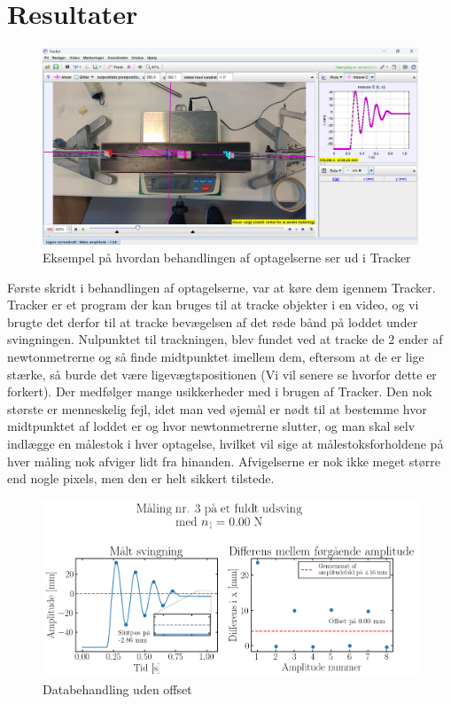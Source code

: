 \chapter{Resultater}
\begin{figure}[htbp]
    \centering
    \includegraphics[width=0.8\linewidth,origin=c]{figures/data_eksempel.png}
    \caption{Eksempel på hvordan behandlingen af optagelserne ser ud i Tracker}
    \label{fig:tracker}
\end{figure}
Første skridt i behandlingen af optagelserne, var at køre dem igennem Tracker. 
Tracker er et program der kan bruges til at tracke objekter i en video, 
og vi brugte det derfor til at tracke bevægelsen af det røde bånd på loddet under svingningen.
Nulpunktet til trackningen, blev fundet ved at tracke de 2 ender af newtonmetrerne og så finde midtpunktet imellem dem, 
eftersom at de er lige stærke, så burde det være ligevægtspositionen (Vi vil senere se hvorfor dette er forkert).
Der medfølger mange usikkerheder med i brugen af Tracker. Den nok største er menneskelig fejl, 
idet man ved øjemål er nødt til at bestemme hvor midtpunktet af loddet er og hvor newtonmetrerne slutter,
og man skal selv indlægge en målestok i hver optagelse, hvilket vil sige at målestoksforholdene på hver måling nok afviger lidt fra hinanden. 
Afvigelserne er nok ikke meget større end nogle pixels, men den er helt sikkert tilstede.
\begin{figure}[htbp]
    \centering
    \includegraphics[width=0.8\linewidth,origin=c]{figures/non0.00-maks3.png}
    \caption{Databehandling uden offset}
    \label{fig:dårlig_graf}
\end{figure}
